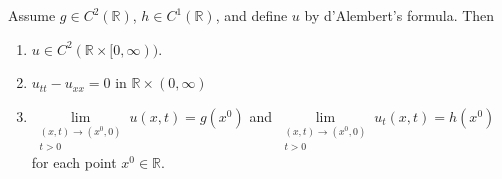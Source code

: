 \documentclass{article}
\begin{document}
\begin{theorem}[Solution to the Wave Equation ($n = 1$)]
	Assume $g \in C^{2}(\mathbb{R})$, $h \in C^{1}(\mathbb{R})$, and define $u$ by d'Alembert's formula. Then \vspace{-0.25cm}
	\begin{enumerate}[itemsep =-2pt,label = (\roman{*})]
		\item $u \in C^{2}(\mathbb{R} \times [0, \infty))$. 
		\item $u_{tt} - u_{xx} = 0$ in $\mathbb{R} \times (0, \infty)$ 
		\item $\lim\limits_{\substack{(x, t) \to (x^{0}, 0) \\ t > 0}}u(x, t) = g(x^{0})$ and $\lim\limits_{\substack{(x, t) \to (x^{0}, 0) \\ t > 0}}u_{t}(x, t) = h(x^{0})$ for each point $x^{0} \in \mathbb{R}$. 
	\end{enumerate}
\end{theorem}
\newpage 
\end{document}
